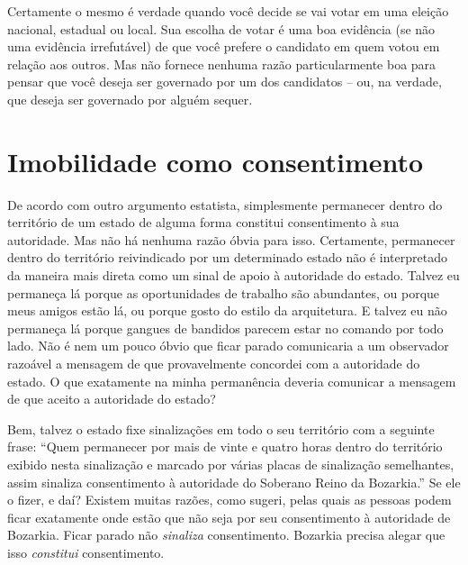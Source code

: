 Certamente o mesmo é verdade quando você decide se vai votar em uma eleição nacional, estadual ou local. Sua escolha de votar é uma boa evidência (se não uma evidência irrefutável) de que você prefere o candidato em quem votou em relação aos outros. Mas não fornece nenhuma razão particularmente boa para pensar que você deseja ser governado por um dos candidatos -- ou, na verdade, que deseja ser governado por alguém sequer.

\section{Imobilidade como consentimento}

De acordo com outro argumento estatista, simplesmente permanecer dentro do território de um estado de alguma forma constitui consentimento à sua autoridade. Mas não há nenhuma razão óbvia para isso. Certamente, permanecer dentro do território reivindicado por um determinado estado não é interpretado da maneira mais direta como um sinal de apoio à autoridade do estado. Talvez eu permaneça lá porque as oportunidades de trabalho são abundantes, ou porque meus amigos estão lá, ou porque gosto do estilo da arquitetura. E talvez eu não permaneça lá porque gangues de bandidos parecem estar no comando por todo lado. Não é nem um pouco óbvio que ficar parado comunicaria a um observador razoável a mensagem de que provavelmente concordei com a autoridade do estado. O que exatamente na minha permanência deveria comunicar a mensagem de que aceito a autoridade do estado?

Bem, talvez o estado fixe sinalizações em todo o seu território com a seguinte frase: ``Quem permanecer por mais de vinte e quatro horas dentro do território exibido nesta sinalização e marcado por várias placas de sinalização semelhantes, assim sinaliza consentimento à autoridade do Soberano Reino da Bozarkia.'' Se ele o fizer, e daí? Existem muitas razões, como sugeri, pelas quais as pessoas podem ficar exatamente onde estão que não seja por seu consentimento à autoridade de Bozarkia. Ficar parado não \emph{sinaliza} consentimento. Bozarkia precisa alegar que isso \emph{constitui} consentimento.

